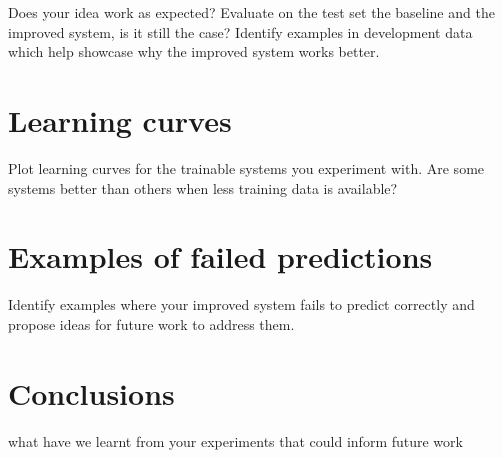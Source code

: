 \documentclass[11pt,a4paper]{article}
\begin{document}
Does your idea work as expected? Evaluate on the test set the baseline and the improved system, is it still the case? Identify examples in development data which help showcase why the improved system works better.

\section{Learning curves}

Plot learning curves for the trainable systems you experiment with. Are some systems better than others when less training data is available?

\section{Examples of failed predictions}

Identify examples where your improved system fails to predict correctly and propose ideas for future work to address them.

\section{Conclusions}

what have we learnt from your experiments that could inform future work


%
%



\end{document}
